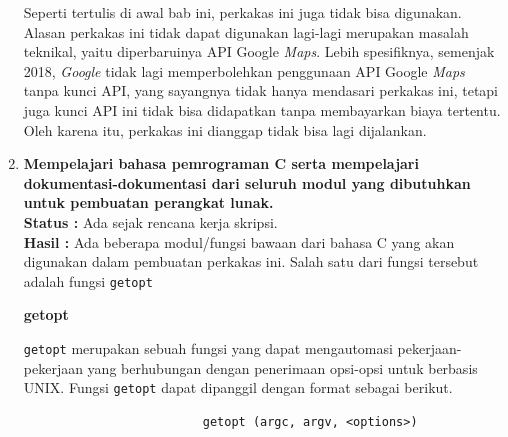 \documentclass[a4paper,twoside]{article}
\begin{document}
\begin{enumerate}
Seperti tertulis di awal bab ini, perkakas ini juga tidak bisa digunakan. Alasan perkakas ini tidak dapat digunakan lagi-lagi merupakan masalah teknikal, yaitu diperbaruinya API Google \textit{Maps}. Lebih spesifiknya, semenjak 2018, \textit{Google} tidak lagi memperbolehkan penggunaan API Google \textit{Maps} tanpa kunci API, yang sayangnya tidak hanya mendasari perkakas ini, tetapi juga kunci API ini tidak bisa didapatkan tanpa membayarkan biaya tertentu. Oleh karena itu, perkakas ini dianggap tidak bisa lagi dijalankan.
		
		\item \textbf{Mempelajari bahasa pemrograman C serta mempelajari dokumentasi-dokumentasi dari seluruh modul yang dibutuhkan untuk pembuatan perangkat lunak.}\\
		{\bf Status :} Ada sejak rencana kerja skripsi.\\
		{\bf Hasil :} Ada beberapa modul/fungsi bawaan dari bahasa C yang akan digunakan dalam pembuatan perkakas \cl ini. Salah satu dari fungsi tersebut adalah fungsi \verb|getopt|

\large{\textbf{getopt \cite{loosemore:2022:gnuclibrary}}}
\label{sec:cmodules-getopt}

\verb|getopt| merupakan sebuah fungsi yang dapat mengautomasi pekerjaan-pekerjaan yang berhubungan dengan penerimaan opsi-opsi untuk \cl berbasis UNIX.
\newline\newline\noindent
Fungsi \verb|getopt| dapat dipanggil dengan format sebagai berikut.

\begin{verbatim}
                         getopt (argc, argv, <options>)
\end{verbatim}


\end{enumerate}
\end{document}

